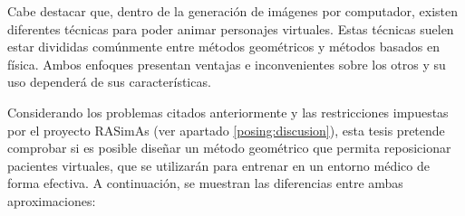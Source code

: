  
Cabe destacar que, dentro de la generación de imágenes por computador, existen diferentes técnicas para poder animar personajes virtuales.
Estas técnicas suelen estar divididas comúnmente entre métodos geométricos y métodos basados en física. Ambos enfoques presentan ventajas e inconvenientes sobre los otros y su uso dependerá de sus características. 

Considerando los problemas citados anteriormente y las restricciones impuestas por el proyecto \ac{RASimAs} (ver apartado \ref{posing:discusion}), esta tesis pretende comprobar si es posible diseñar un método geométrico que permita reposicionar pacientes virtuales, que se utilizarán para entrenar en un entorno médico de forma efectiva. A continuación, se muestran las diferencias entre ambas aproximaciones:

